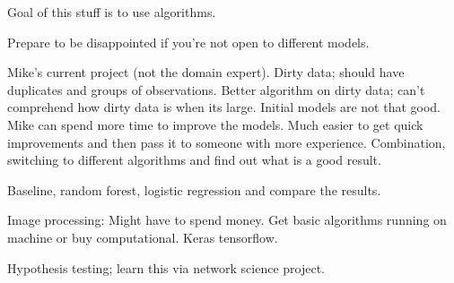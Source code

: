 Goal of this stuff is to use algorithms.

Prepare to be disappointed if you're not open to
different models.

Mike's current project (not the domain expert).
Dirty data; should have duplicates and groups of
observations. Better algorithm on dirty data; can't comprehend how dirty data is when its large. Initial models are not that good. Mike can spend more time to improve the models. Much
easier to get quick improvements and then pass it to someone with more experience. Combination,
switching to different algorithms and find out what is a good result.

Baseline, random forest, logistic regression and
compare the results.

Image processing: Might have to spend money. Get basic algorithms running on machine or buy computational. Keras tensorflow.

Hypothesis testing; learn this via network science project. 